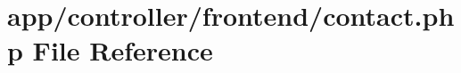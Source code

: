 \hypertarget{controller_2frontend_2contact_8php}{\section{app/controller/frontend/contact.php File Reference}
\label{controller_2frontend_2contact_8php}
}
